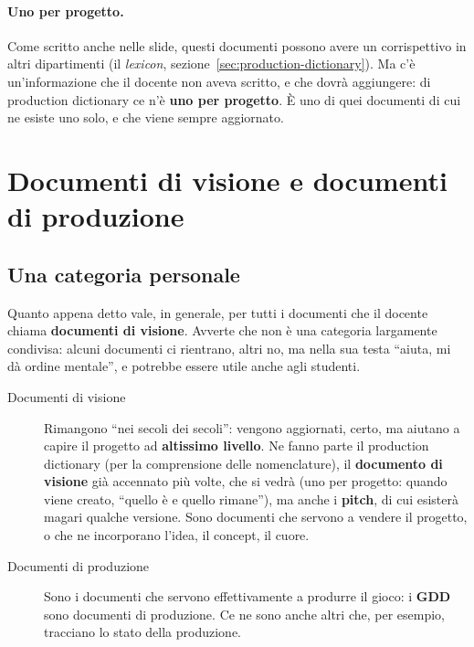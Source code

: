 \paragraph{Uno per progetto.} Come scritto anche nelle slide, questi documenti
possono avere un corrispettivo in altri dipartimenti (il \emph{lexicon},
sezione~\ref{sec:production-dictionary}). Ma c'è un'informazione che il
docente non aveva scritto, e che dovrà aggiungere: di production dictionary
ce n'è \textbf{uno per progetto}. È uno di quei documenti di cui ne esiste
uno solo, e che viene sempre aggiornato.

\section{Documenti di visione e documenti di produzione}
\label{sec:documenti-visione}

\subsection{Una categoria personale}

Quanto appena detto vale, in generale, per tutti i documenti che il docente
chiama \textbf{documenti di visione}. Avverte che non è una categoria
largamente condivisa: alcuni documenti ci rientrano, altri no, ma nella sua
testa ``aiuta, mi dà ordine mentale'', e potrebbe essere utile anche agli
studenti.
\begin{description}
  \item[Documenti di visione] Rimangono ``nei secoli dei secoli'': vengono
        aggiornati, certo, ma aiutano a capire il progetto ad
        \textbf{altissimo livello}. Ne fanno parte il production dictionary
        (per la comprensione delle nomenclature), il \textbf{documento di
        visione} già accennato più volte, che si vedrà (uno per progetto:
        quando viene creato, ``quello è e quello rimane''), ma anche i
        \textbf{pitch}, di cui esisterà magari qualche versione. Sono
        documenti che servono a vendere il progetto, o che ne incorporano
        l'idea, il concept, il cuore.
  \item[Documenti di produzione] Sono i documenti che servono effettivamente
        a produrre il gioco: i \textbf{GDD} sono documenti di produzione.
        Ce ne sono anche altri che, per esempio, tracciano lo stato della
        produzione.
\end{description}

